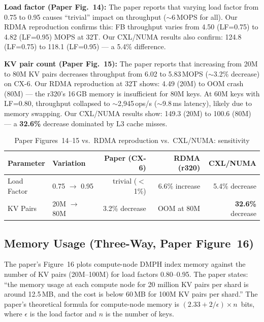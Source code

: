 \documentclass[conference]{IEEEtran}
\begin{document}
\textbf{Load factor (Paper Fig.~14):} The paper reports that varying load factor from 0.75 to 0.95 causes ``trivial'' impact on throughput ($\sim$6\,MOPS for all). Our RDMA reproduction confirms this: FB throughput varies from 4.50 (LF=0.75) to 4.82 (LF=0.95) MOPS at 32T. Our CXL/NUMA results also confirm: 124.8 (LF=0.75) to 118.1 (LF=0.95) --- a 5.4\% difference.

\textbf{KV pair count (Paper Fig.~15):} The paper reports that increasing from 20M to 80M KV pairs decreases throughput from 6.02 to 5.83\,MOPS ($\sim$3.2\% decrease) on CX-6. Our RDMA reproduction at 32T shows: 4.49 (20M) to OOM crash (80M) --- the r320's 16\,GB memory is insufficient for 80M keys. At 60M keys with LF=0.80, throughput collapsed to $\sim$2,945\,ops/s ($\sim$9.8\,ms latency), likely due to memory swapping. Our CXL/NUMA results show: 149.3 (20M) to 100.6 (80M) --- a \textbf{32.6\%} decrease dominated by L3 cache misses.

\begin{table}[H]
\centering
\caption{Paper Figures~14--15 vs.\ RDMA reproduction vs.\ CXL/NUMA: sensitivity}
\label{tab:paper-fig14-15}
\small
\begin{tabular}{@{}llrrr@{}}
\toprule
\textbf{Parameter} & \textbf{Variation} & \textbf{Paper (CX-6)} & \textbf{RDMA (r320)} & \textbf{CXL/NUMA} \\
\midrule
Load Factor & 0.75 $\to$ 0.95 & trivial ($<$1\%) & 6.6\% increase & 5.4\% decrease \\
KV Pairs & 20M $\to$ 80M    & 3.2\% decrease & OOM at 80M & \textbf{32.6\%} decrease \\
\bottomrule
\end{tabular}
\end{table}

\subsection{Memory Usage (Three-Way, Paper Figure~16)}

The paper's Figure~16 plots compute-node DMPH index memory against the number of KV pairs (20M--100M) for load factors 0.80--0.95. The paper states: ``the memory usage at each compute node for 20 million KV pairs per shard is around 12.5\,MB, and the cost is below 60\,MB for 100M KV pairs per shard.'' The paper's theoretical formula for compute-node memory is $(2.33 + 2/\epsilon) \times n$~bits, where $\epsilon$ is the load factor and $n$ is the number of keys.
\end{document}
